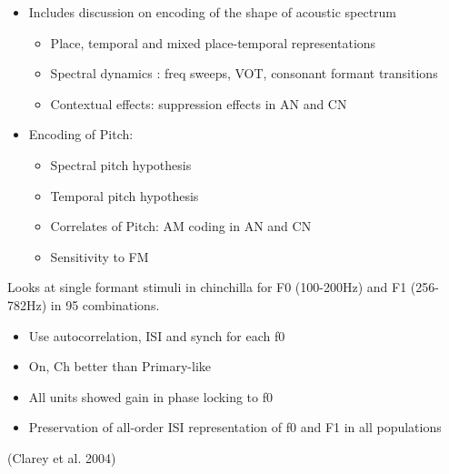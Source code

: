 \documentclass[10pt,a4paper]{article}
\begin{document}
\begin{itemize}
\item Includes discussion on encoding of the shape of acoustic spectrum

  \begin{itemize}
  \item Place, temporal and mixed place-temporal representations
  \item Spectral dynamics : freq sweeps, VOT, consonant formant transitions
  \item Contextual effects: suppression effects in AN and CN
  \end{itemize}
\item Encoding of Pitch:

  \begin{itemize}
  \item Spectral pitch hypothesis
  \item Temporal pitch hypothesis
  \item Correlates of Pitch: AM coding in AN and CN
  \item Sensitivity to FM
  \end{itemize}
\end{itemize}
\citep{Rhode:1998} Looks at single formant stimuli in chinchilla for F0
(100-200Hz) and F1 (256-782Hz) in 95 combinations.


\begin{itemize}
\item Use autocorrelation, ISI and synch for each f0
\item On, Ch better than Primary-like
\item All units showed gain in phase locking to f0
\item Preservation of all-order ISI representation of f0 and F1 in all
  populations
\end{itemize}
(Clarey et al. 2004)
\end{document}
